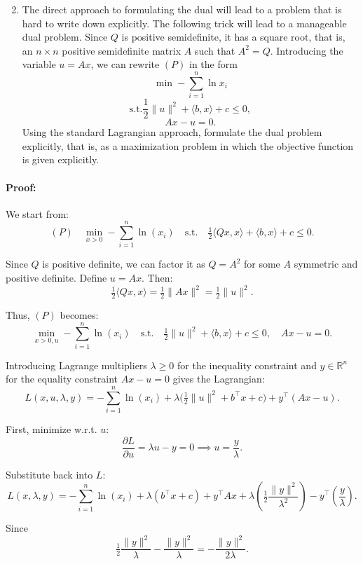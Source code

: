 \documentclass[10pt]{article}
\begin{document}
\begin{enumerate}[label=(\alph*)]
  \setcounter{enumi}{1}
  \item The direct approach to formulating the dual will lead to a problem
  that is hard to write down explicitly. The following trick will lead to a manageable dual problem.
  Since $Q$ is positive semidefinite, it has a square root, that is, an 
  $n \times n$ positive semidefinite matrix $A$ such that $A^2 = Q$. 
  Introducing the variable $u = Ax$, we can rewrite $(P)$ in the form 
  $$\min -\sum_{i=1}^{n} \ln x_i$$
  $$\text{s.t.} \frac{1}{2} \| u \|^2 + \langle b, x \rangle + c \leq 0,$$
  $$Ax - u = 0.$$
  Using the standard Lagrangian approach, formulate the dual problem explicitly, that is, as a maximization problem 
  in which the objective function is given explicitly.
\end{enumerate}

\paragraph{Proof:}


We start from:
\[
(P) \quad \min_{x>0} -\sum_{i=1}^n \ln(x_i) \quad \text{s.t.} \quad \tfrac{1}{2}\langle Qx,x\rangle + \langle b,x\rangle + c \le 0.
\]

Since $Q$ is positive definite, we can factor it as $Q = A^2$ for some $A$ symmetric and positive definite. Define $u = Ax$. Then:
\[
\tfrac12\langle Qx,x\rangle = \tfrac12 \|Ax\|^2 = \tfrac12 \|u\|^2.
\]

Thus, $(P)$ becomes:
\[
\min_{x>0,u} -\sum_{i=1}^n \ln(x_i) \quad \text{s.t.} \quad \tfrac12 \|u\|^2 + \langle b,x\rangle + c \le 0, \quad Ax - u = 0.
\]

Introducing Lagrange multipliers $\lambda \ge 0$ for the inequality constraint and $y \in \mathbb{R}^n$ for the equality constraint $Ax - u=0$ gives the Lagrangian:
\[
L(x,u,\lambda,y) = -\sum_{i=1}^n \ln(x_i) + \lambda\bigl(\tfrac12 \|u\|^2 + b^\top x + c\bigr) + y^\top(Ax - u).
\]

First, minimize w.r.t. $u$:
\[
\frac{\partial L}{\partial u} = \lambda u - y = 0 \implies u = \frac{y}{\lambda}.
\]

Substitute back into $L$:
\[
L(x,\lambda,y) = -\sum_{i=1}^n \ln(x_i) + \lambda(b^\top x + c) + y^\top A x + \lambda\left(\tfrac12 \frac{\|y\|^2}{\lambda^2}\right) - y^\top\left(\frac{y}{\lambda}\right).
\]

Since
\[
\tfrac12 \frac{\|y\|^2}{\lambda} - \frac{\|y\|^2}{\lambda} = -\frac{\|y\|^2}{2\lambda}.
\]
\end{document}
